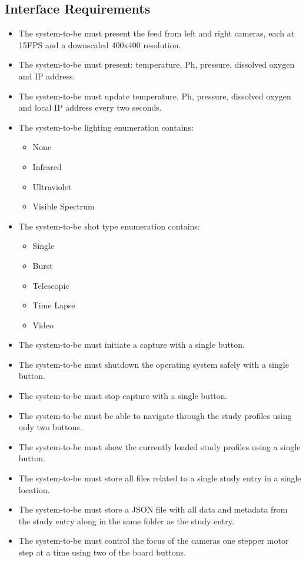 \subsection{Interface Requirements}
\begin{itemize}
	\item The system-to-be must present the feed from left and right cameras, each at 15FPS and a downscaled 400x400 resolution.
	\item The system-to-be must present: temperature, Ph, pressure, dissolved oxygen and IP address.
	\item The system-to-be must update temperature, Ph, pressure, dissolved oxygen and local IP address every two seconds.
        \item The system-to-be lighting enumeration contains:
          \begin{itemize}
          \item None
          \item Infrared
          \item Ultraviolet
          \item Visible Spectrum
          \end{itemize}
        \item The system-to-be shot type enumeration contains:
          \begin{itemize}
          \item Single
          \item Burst
          \item Telescopic
          \item Time Lapse
          \item Video
          \end{itemize}
	\item The system-to-be must initiate a capture with a single button.
	\item The system-to-be must shutdown the operating system safely with a single button.
	\item The system-to-be must stop capture with a single button.
	\item The system-to-be must be able to navigate through the study profiles using only two buttons.
	\item The system-to-be must show the currently loaded study profiles using a single button.
	\item The system-to-be must store all files related to a single study entry in a single location.
        \item The system-to-be must store a JSON file with all data and metadata from the study entry along in the same folder as the study entry.
	\item The system-to-be must control the focus of the cameras one stepper motor step at a time using two of the board buttons.
\end{itemize}